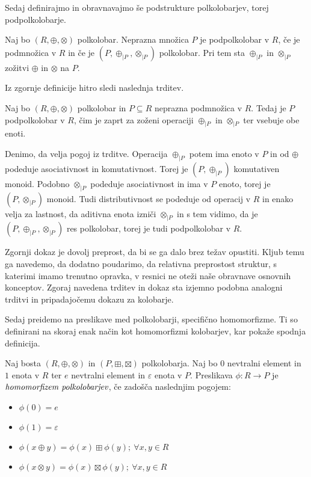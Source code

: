 \documentclass[mat1]{fmfdelo}
\newcommand{\pojem}[1]{\ensuremath{\emph{#1}}}
\newcommand{\map}[3]{\ensuremath{{#1}:{#2}\rightarrow{#3}}}
\begin{document}
Sedaj definirajmo in obravnavajmo še podstrukture polkolobarjev, torej podpolkolobarje.

\begin{definicija}
	Naj bo $(R, \oplus, \otimes)$ polkolobar. Neprazna množica $P$ je podpolkolobar v $R$, če je podmnožica v $R$ in če je $(P, \oplus_{|P}, \otimes_{|P})$ polkolobar. Pri tem sta $\oplus_{|P}$ in $\otimes_{|P}$ zožitvi $\oplus$ in $\otimes$ na $P$.
\end{definicija}

Iz zgornje definicije hitro sledi naslednja trditev.

\begin{trditev}
	Naj bo $(R, \oplus, \otimes)$ polkolobar in $P\subseteq R$ neprazna podmnožica v $R$. Tedaj je $P$ podpolkolobar v $R$, čim je zaprt za zoženi operaciji $\oplus_{|P}$ in $\otimes_{|P}$ ter vsebuje obe enoti.
\end{trditev}
\begin{dokaz}
	Denimo, da velja pogoj iz trditve. Operacija $\oplus_{|P}$ potem ima enoto v $P$ in od $\oplus$ podeduje asociativnost in komutativnost. Torej je $(P, \oplus_{|P})$ komutativen monoid. Podobno $\otimes_{|P}$ podeduje asociativnost in ima v $P$ enoto, torej je $(P, \otimes_{|P})$ monoid.
	Tudi distributivnost se podeduje od operacij v $R$ in enako velja za lastnost, da aditivna enota izniči $\otimes_{|P}$ in s tem vidimo, da je $(P, \oplus_{|P}, \otimes_{|P})$ res polkolobar, torej je tudi podpolkolobar v $R$.
\end{dokaz}

Zgornji dokaz je dovolj preprost, da bi se ga dalo brez težav opustiti. Kljub temu ga navedemo, da dodatno poudarimo, da relativna preprostost struktur, s katerimi imamo trenutno opravka, v resnici ne oteži naše obravnave osnovnih konceptov. Zgoraj navedena trditev in dokaz sta izjemno podobna analogni trditvi in pripadajočemu dokazu za kolobarje.
	
Sedaj preidemo na preslikave med polkolobarji, specifično homomorfizme. Ti so definirani na skoraj enak način kot homomorfizmi kolobarjev, kar pokaže spodnja definicija.
	
\begin{definicija}
	Naj bosta $(R, \oplus, \otimes)$ in $(P, \boxplus, \boxtimes)$  polkolobarja. Naj bo $0$ nevtralni element in $1$ enota v $R$ ter $e$ nevtralni element in $\varepsilon$ enota v $P$. Preslikava $\map{\phi}{R}{P}$ je \pojem{homomorfizem polkolobarjev}, če zadošča naslednjim pogojem:
	\begin{itemize}
		\item $\phi(0) = e$
		\item $\phi(1) = \varepsilon$
		\item $\phi(x \oplus y) = \phi(x) \boxplus\phi(y) ;~\forall x, y\in R$
		\item $\phi(x \otimes y) = \phi(x) \boxtimes\phi(y) ;~\forall x, y\in R$
	\end{itemize}
\end{definicija}
\end{document}

